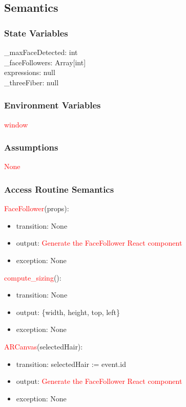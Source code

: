 \documentclass[12pt, titlepage]{article}
\begin{document}
\subsection{Semantics}

\subsubsection{State Variables}
\_maxFaceDetected: int\\
\_faceFollowers: Array[int]\\
expressions: null\\
\_threeFiber: null\\

\subsubsection{Environment Variables}
\textcolor{red}{window}

\subsubsection{Assumptions}
\textcolor{red}{None}

\subsubsection{Access Routine Semantics}

\noindent \textcolor{red}{FaceFollower}(props):
\begin{itemize}
\item transition: None
\item output: \textcolor{red}{Generate the FaceFollower React component} 
\item exception: None
\end{itemize}

\noindent \textcolor{red}{compute\_sizing}():
\begin{itemize}
\item transition: None
\item output: \{width, height, top, left\} 
\item exception: None
\end{itemize}

\noindent \textcolor{red}{ARCanvas}(selectedHair):
\begin{itemize}
\item transition: selectedHair := event.id
\item output: \textcolor{red}{Generate the FaceFollower React component} 
\item exception: None
\end{itemize}
\end{document}

